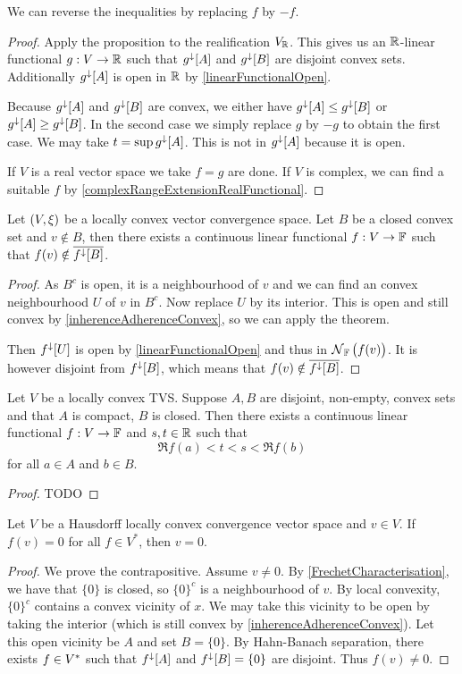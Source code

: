 We can reverse the inequalities by replacing $f$ by $-f$.
\begin{proof}
Apply the proposition to the realification $V_{\mathbb{R}}$. This gives us an $\mathbb{R}$-linear functional $g: V\to \mathbb{R}$ such that $g^\downarrow[A]$ and $g^\downarrow[B]$ are disjoint convex sets. Additionally $g^{\downarrow}[A]$ is open in $\mathbb{R}$ by \ref{linearFunctionalOpen}.

Because $g^\downarrow[A]$ and $g^\downarrow[B]$ are convex, we either have $g^\downarrow[A]\leq g^\downarrow[B]$ or $g^\downarrow[A]\geq g^\downarrow[B]$. In the second case we simply replace $g$ by $-g$ to obtain the first case. We may take $t= \sup g^\downarrow[A]$. This is not in $g^\downarrow[A]$ because it is open.

If $V$ is a real vector space we take $f=g$ are done. If $V$ is complex, we can find a suitable $f$ by \ref{complexRangeExtensionRealFunctional}.
\end{proof}
\begin{corollary} \label{locallyConvexHahnBanachSeparationClosedSet}
Let $\left( V, \xi \right)$ be a locally convex vector convergence space. Let $B$ be a closed convex set and $v\notin B$, then there exists a continuous linear functional $f:V\to \mathbb{F}$ such that $f(v) \notin \overline{f^\downarrow[B]}$.
\end{corollary}
\begin{proof}
As $B^c$ is open, it is a neighbourhood of $v$ and we can find an convex neighbourhood $U$ of $v$ in $B^c$. Now replace $U$ by its interior. This is open and still convex by \ref{inherenceAdherenceConvex}, so we can apply the theorem.

Then $f^\downarrow[U]$ is open by \ref{linearFunctionalOpen} and thus in $\operatorname{\mathcal{N}}_{\mathbb{F}}\big(f(v)\big)$. It is however disjoint from $f^\downarrow[B]$, which means that $f(v) \notin \overline{f^\downarrow[B]}$.
\end{proof}
\begin{corollary}
Let $V$ be a locally convex TVS. Suppose $A,B$ are disjoint, non-empty, convex sets and that $A$ is compact, $B$ is closed. Then there exists a continuous linear functional $f:V\to \mathbb{F}$ and $s,t\in \mathbb{R}$ such that
\[ \Re f(a) < t < s < \Re f(b) \]
for all $a\in A$ and $b\in B$.
\end{corollary}
\begin{proof}
TODO
\end{proof}
\begin{corollary} \label{locallyConvexDualPair}
Let $V$ be a Hausdorff locally convex convergence vector space and $v\in V$. If $f(v) = 0$ for all $f\in V^*$, then $v = 0$.
\end{corollary}
\begin{proof}
We prove the contrapositive. Assume $v\neq 0$. By \ref{FrechetCharacterisation}, we have that $\{0\}$ is closed, so $\{0\}^c$ is a neighbourhood of $v$. By local convexity, $\{0\}^c$ contains a convex vicinity of $x$. We may take this vicinity to be open by taking the interior (which is still convex by \ref{inherenceAdherenceConvex}). Let this open vicinity be $A$ and set $B = \{0\}$. By Hahn-Banach separation, there exists $f\in {V}^*$ such that $f^\downarrow[A]$ and $f^\downarrow[B] = \{0\}$ are disjoint. Thus $f(v) \neq 0$.
\end{proof}

